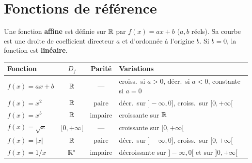 \section{Fonctions de r\'ef\'erence}

\begin{defn}
Une fonction \textbf{affine} est d\'efinie sur $\mathbb{R}$ par $f(x)=ax+b$ ($a,b$ r\'eels).
Sa courbe est une droite de coefficient directeur $a$ et d'ordonn\'ee \`a
l'origine $b$. Si $b=0$, la fonction est \textbf{lin\'eaire}.
\end{defn}

\begin{center}
\renewcommand{\arraystretch}{1.5}
\begin{tabular}{|l|c|c|l|}
\hline
\rowcolor{BN!10}
Fonction & $D_f$ & Parit\'e & Variations \\
\hline
$f(x)=ax+b$  & $\mathbb{R}$ & --- & croiss.\ si $a>0$, d\'ecr.\ si $a<0$, constante si $a=0$ \\
$f(x)=x^2$   & $\mathbb{R}$ & paire   & d\'ecr.\ sur $]-\infty,0]$, croiss.\ sur $[0,+\infty[$ \\
$f(x)=x^3$   & $\mathbb{R}$ & impaire & croissante sur $\mathbb{R}$ \\
$f(x)=\sqrt{x}$ & $[0,+\infty[$ & --- & croissante sur $[0,+\infty[$ \\
$f(x)=|x|$   & $\mathbb{R}$ & paire   & d\'ecr.\ sur $]-\infty,0]$, croiss.\ sur $[0,+\infty[$ \\
$f(x)=1/x$   & $\mathbb{R}^*$ & impaire & d\'ecroissante sur $]-\infty,0[$ et sur $]0,+\infty[$ \\
\hline
\end{tabular}
\end{center}

